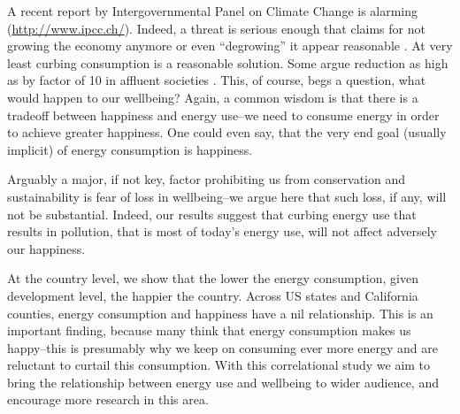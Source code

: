 \documentclass[10pt, letterpaper]{article}
\begin{document}
\begin{spacing}{1.4}
A recent report by
Intergovernmental Panel on Climate Change is alarming 
(\url{http://www.ipcc.ch/}). %
Indeed, a threat is serious enough that
claims for not growing the economy anymore or even ``degrowing'' it
appear reasonable \cite{kallis11, kallis12}. %
At very
least curbing consumption is a reasonable solution. Some argue reduction as high
as by factor of 10 in affluent societies \cite{pretty13}. This,
of course, begs a question, what would happen to our wellbeing?
 Again, a common %
wisdom is that there is a tradeoff between happiness and
energy use--we need to consume energy in order to achieve greater
happiness. One could even say, that the very end goal (usually implicit)
of energy consumption is happiness.  %

Arguably a major, if not key, factor prohibiting us from conservation and
sustainability is fear of loss in wellbeing--we argue here that such loss, if
any,  will
not be substantial. Indeed, our results suggest that curbing energy use that results
in pollution, that is most of today's energy use, will not affect adversely our
happiness.  %

At the country level, we show that the lower the energy consumption, given development
level, the happier the country.  Across US states and California counties,
energy consumption and happiness have a nil relationship. 
This is an important finding,  because many think that energy consumption makes us
happy--this is presumably why we keep on consuming ever more energy and are
reluctant to curtail this consumption. %
With this correlational study we aim to bring the relationship between energy
use and wellbeing to wider audience, and encourage more research in this area. 




\end{spacing}
\end{document}
